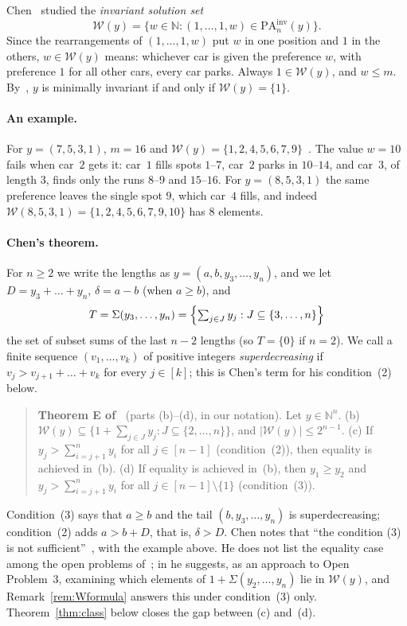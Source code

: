\documentclass[11pt]{article}
\theoremstyle{remark}
\newcommand{\N}{\mathbb N}
\newcommand{\W}{\mathcal W}
\newcommand{\PA}{\mathrm{PA}}
\newcommand{\Sub}{\Sigma}
\begin{document}
Chen~\cite[Theorem~E and Definition~4.1]{chen} studied the \emph{invariant
solution set}
\[
\W(y)=\{w\in\N:(1,\dots,1,w)\in\PA_n^{\mathrm{inv}}(y)\}.
\]
Since the rearrangements of $(1,\dots,1,w)$ put $w$ in one position and $1$ in
the others, $w\in\W(y)$ means: whichever car is given the preference $w$, with
preference $1$ for all other cars, every car parks. Always $1\in\W(y)$, and
$w\le m$. By~\cite[Theorem~4.5]{chmps}, $y$ is minimally invariant if and only
if $\W(y)=\{1\}$.

\paragraph{An example.} For $y=(7,5,3,1)$, $m=16$ and
$\W(y)=\{1,2,4,5,6,7,9\}$~\cite[Remark~4.7]{chen}. The value $w=10$ fails when
car~$2$ gets it: car~$1$ fills spots $1$--$7$, car~$2$ parks in $10$--$14$, and
car~$3$, of length $3$, finds only the runs $8$--$9$ and $15$--$16$. For $y=(8,5,3,1)$ the same preference leaves the
single spot $9$, which car~$4$ fills, and indeed
$\W(8,5,3,1)=\{1,2,4,5,6,7,9,10\}$ has $8$ elements.

\paragraph{Chen's theorem.} For $n\ge2$ we write the lengths as
$y=(a,b,y_3,\dots,y_n)$, and we let $D=y_3+\dots+y_n$, $\delta=a-b$ (when
$a\ge b$), and
\[
T=\Sub(y_3,\dots,y_n)=\Bigl\{\textstyle\sum_{j\in J}y_j:J\subseteq\{3,\dots,n\}\Bigr\}
\]
the set of subset sums of the last $n-2$ lengths (so $T=\{0\}$ if $n=2$). We
call a finite sequence $(v_1,\dots,v_k)$ of positive integers
\emph{superdecreasing} if $v_j>v_{j+1}+\dots+v_k$ for every $j\in[k]$; this is
Chen's term for his condition~(2) below.

\begin{quote}
\textbf{Theorem E of~\cite{chen}} (parts (b)--(d), in our notation). Let $y\in\N^n$.
(b) $\W(y)\subseteq\{1+\sum_{j\in J}y_j: J\subseteq\{2,\dots,n\}\}$, and
$|\W(y)|\le 2^{n-1}$.
(c) If $y_j>\sum_{i=j+1}^n y_i$ for all $j\in[n-1]$ (condition~(2)), then
equality is achieved in~(b).
(d) If equality is achieved in~(b), then $y_1\ge y_2$ and
$y_j>\sum_{i=j+1}^n y_i$ for all $j\in[n-1]\setminus\{1\}$ (condition~(3)).
\end{quote}

\noindent Condition~(3) says that $a\ge b$ and the tail $(b,y_3,\dots,y_n)$
is superdecreasing; condition~(2) adds $a>b+D$, that is, $\delta>D$. Chen notes
that ``the condition (3) is not sufficient''~\cite[Remark~4.7]{chen}, with the
example above. He does not list the equality case among the open problems
of~\cite[Section~5]{chen}; in \cite[Section~5.3]{chen} he suggests, as an
approach to Open Problem~3, examining which elements of $1+\Sub(y_2,\dots,y_n)$
lie in $\W(y)$, and Remark~\ref{rem:Wformula} answers this under
condition~(3) only. Theorem~\ref{thm:class} below closes the gap between (c)
and~(d).
\end{document}
